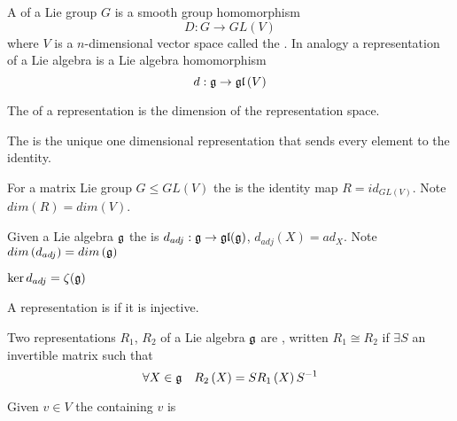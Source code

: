 \documentclass{article}
\begin{document}
\begin{definition}[Representations]
	A  of a Lie group $G$ is a smooth group homomorphism 
	\[
	D:G\to GL\left(V\right)
	\]
	where $V$ is a $n$-dimensional vector space called the .
	In analogy a representation of a Lie algebra is a Lie algebra homomorphism 
	\[
	d:\mathfrak{g} \to \mathfrak{gl}\left(V\right)
	\]
\end{definition}

\begin{definition}[Dimension]
	The  of a representation is the dimension of the representation space.
\end{definition}

\begin{definition} 
	The  is the unique one dimensional representation that sends every element to the identity. 
\end{definition}

\begin{definition}
	For a matrix Lie group $G\leq GL(V)$ the  is the identity map $R=id_{GL(V)}$. Note $dim\left(R\right)=dim\left(V\right)$.
\end{definition}

\begin{definition}
	Given a Lie algebra $\mathfrak{g}$ the  is $d_{adj}:\mathfrak{g}\to\mathfrak{gl}(\mathfrak{g})$, $d_{adj}\left(X\right)=ad_X $. Note $dim\left(d_{adj}\right)=dim\left(\mathfrak{g}\right)$
\end{definition}
\begin{prop}
	$\ker d_{adj} = \zeta(\mathfrak{g})$
\end{prop}

\begin{definition}
	A representation is  if it is injective. 
\end{definition}

\begin{definition}
	Two representations $R_1$, $R_2$ of a Lie algebra $\mathfrak{g}$ are , written $R_1 \cong R_2$ if $\exists S$ an invertible matrix such that 
	\[
	\forall X\in\mathfrak{g} \quad R_2\left(X\right)=S R_1\left(X\right) S^{-1}
	\]
\end{definition}

\begin{definition}
	Given $v \in V$ the  containing $v$ is 
\end{definition}
\end{document}
